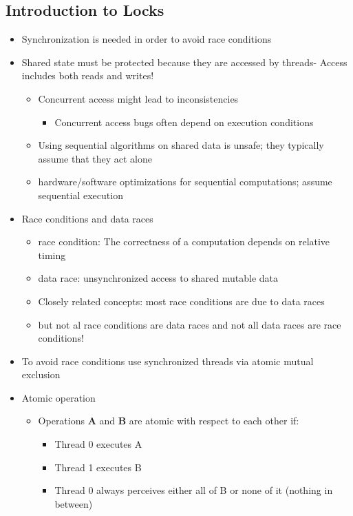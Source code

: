 \documentclass[a4paper]{article}
\begin{document}
	\subsection*{Introduction to Locks}
	\begin{itemize}
		\item Synchronization is needed in order to avoid race conditions
		\item Shared state must be protected because they are accessed by threads- Access includes both reads and writes!
			\begin{itemize}
				\item Concurrent access might lead to inconsistencies
					\begin{itemize}
						\item Concurrent access bugs often depend on execution conditions
					\end{itemize}
				\item Using sequential algorithms on shared data is unsafe; they typically assume that they act alone
				\item hardware/software optimizations for sequential computations; assume sequential execution
			\end{itemize}
		\item Race conditions and data races
			\begin{itemize}
				\item race condition: The correctness of a computation depends on relative timing
				\item data race: unsynchronized access to shared mutable data
				\item Closely related concepts: most race conditions are due to data races
				\item but not al race conditions are data races and not all data races are race conditions!
			\end{itemize}
		\item To avoid race conditions use synchronized threads via atomic mutual exclusion
		\item Atomic operation
			\begin{itemize}
				\item Operations \textbf{A} and \textbf{B} are atomic with respect to each other if:
					\begin{itemize}
						\item Thread 0 executes A
						\item Thread 1 executes B
						\item Thread 0 always perceives either all of B or none of it (nothing in between)

\end{itemize}
\end{itemize}
\end{itemize}
\end{document}
